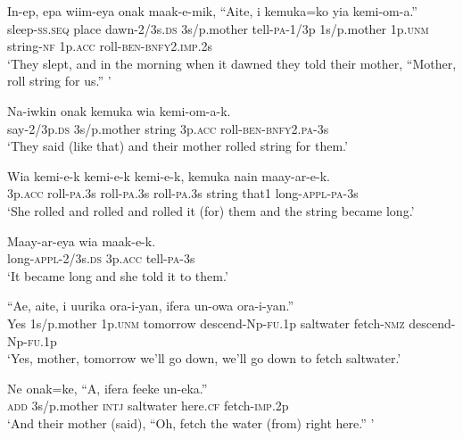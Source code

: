{\ea\label{ex:a:x14}
\gll  In-ep,  epa  wiim-eya  onak  maak-e-mik,  “Aite,                     i  kemuka=ko  yia  kemi-om-a.” \\
sleep-\textsc{ss.seq}  place  dawn-2/3s.\textsc{ds}  3s/p.mother  tell-\textsc{pa}-1/3p  1s/p.mother  1p.\textsc{unm}  string-\textsc{nf}  1p.\textsc{acc}  roll-\textsc{ben}-\textsc{bnfy}2.\textsc{imp}.2s \\


\glt ‘They slept, and in the morning when it dawned they told their mother, “Mother, roll string for us.” ’ \\
\z


\ea\label{ex:a:x15}
\gll  Na-iwkin  onak  kemuka  wia  kemi-om-a-k. \\
say-2/3p.\textsc{ds}  3s/p.mother  string  3p.\textsc{acc}  roll-\textsc{ben}-\textsc{bnfy}2.\textsc{pa}-3s \\
\glt ‘They said (like that) and their mother rolled string for them.’ \\
\z


\ea\label{ex:a:x16}
\gll  Wia  kemi-e-k  kemi-e-k  kemi-e-k,  kemuka  nain  maay-ar-e-k. \\
3p.\textsc{acc}  roll-\textsc{pa}.3s  roll-\textsc{pa}.3s  roll-\textsc{pa}.3s  string  that1  long-\textsc{appl}-\textsc{pa}-3s \\
\glt ‘She rolled and rolled and rolled it (for) them and the string became long.’ \\
\z


\ea\label{ex:a:x17}
\gll  Maay-ar-eya  wia  maak-e-k. \\
long-\textsc{appl}-2/3s.\textsc{ds}  3p.\textsc{acc}  tell-\textsc{pa}-3s \\
\glt ‘It became long and she told it to them.’ \\
\z


\ea\label{ex:a:x18}
\gll  “Ae,  aite,  i  uurika  ora-i-yan,  ifera                  un-owa  ora-i-yan.” \\
Yes  1s/p.mother  1p.\textsc{unm}  tomorrow  descend-Np-\textsc{fu}.1p  saltwater  fetch-\textsc{nmz}  descend-Np-\textsc{fu}.1p \\


\glt ‘Yes, mother, tomorrow we’ll go down, we’ll go down to fetch saltwater.’ \\
\z


\ea\label{ex:a:x19}
\gll  Ne  onak=ke,  “A,  ifera  feeke  un-eka.” \\
\textsc{add}  3s/p.mother  \textsc{intj}  saltwater  here.\textsc{cf}  fetch-\textsc{imp}.2p \\
\glt ‘And their mother (said), “Oh, fetch the water (from) right here.” ’ \\
\z


}
